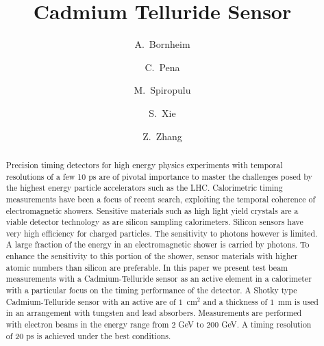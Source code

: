 \documentclass[preprint,1p]{elsarticle}
\begin{document}
\linenumbers

\begin{frontmatter}



\title{Cadmium Telluride Sensor}


\author[1]{A.~Bornheim}
\author[1]{C.~Pena}
\author[1]{M.~Spiropulu}
\author[1,cor]{S.~Xie}
\author[1]{Z.~Zhang}
\address[1]{California Institute of Technology, Pasadena, CA, USA}

\begin{abstract}


\end{abstract}
\begin{abstract}
Precision timing detectors for high energy physics experiments with temporal resolutions of a few 10 ps are
of pivotal importance to master the challenges posed by the highest energy particle accelerators such as the LHC.
Calorimetric timing measurements have been a focus of recent search, exploiting the temporal coherence of 
electromagnetic showers. Sensitive materials such as high light yield crystals are a viable detector technology as
are silicon sampling calorimeters. Silicon sensors have very high efficiency for charged particles. The sensitivity to
photons however is limited. A large fraction of the energy in an electromagnetic shower is carried by photons.
To enhance the sensitivity to this portion of the shower, sensor materials with higher atomic numbers than silicon 
are preferable.  In this paper we present test beam measurements with a Cadmium-Telluride sensor as 
an active element in a calorimeter with a particular focus on the timing performance of the detector. 
A Shotky type Cadmium-Telluride sensor with an active are of $1$~$\mathrm{cm}^{2}$ and a thickness of $1$~mm 
is used in an arrangement with tungsten and lead absorbers. Measurements are performed with electron beams 
in the energy range from 2 GeV to 200 GeV. A timing resolution of 20 ps is achieved under the best conditions.
\end{abstract}



\end{frontmatter}
\end{document}
